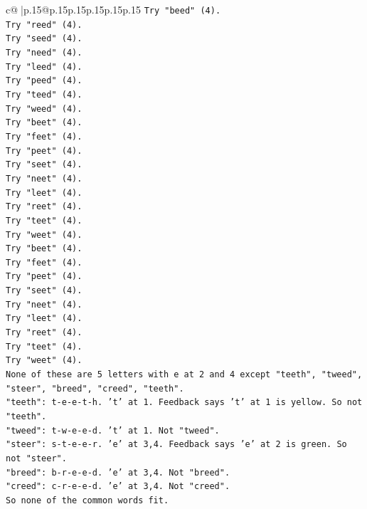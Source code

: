 \documentclass{article}
\begin{document}
{\begin{supertabular}{c@{$\;$}|p{.15\linewidth}@{}p{.15\linewidth}p{.15\linewidth}p{.15\linewidth}p{.15\linewidth}p{.15\linewidth}}
{{{\texttt{Try "beed" (4).} \\
\texttt{Try "reed" (4).} \\
\texttt{Try "seed" (4).} \\
\texttt{Try "need" (4).} \\
\texttt{Try "leed" (4).} \\
\texttt{Try "peed" (4).} \\
\texttt{Try "teed" (4).} \\
\texttt{Try "weed" (4).} \\
\texttt{Try "beet" (4).} \\
\texttt{Try "feet" (4).} \\
\texttt{Try "peet" (4).} \\
\texttt{Try "seet" (4).} \\
\texttt{Try "neet" (4).} \\
\texttt{Try "leet" (4).} \\
\texttt{Try "reet" (4).} \\
\texttt{Try "teet" (4).} \\
\texttt{Try "weet" (4).} \\
\texttt{Try "beet" (4).} \\
\texttt{Try "feet" (4).} \\
\texttt{Try "peet" (4).} \\
\texttt{Try "seet" (4).} \\
\texttt{Try "neet" (4).} \\
\texttt{Try "leet" (4).} \\
\texttt{Try "reet" (4).} \\
\texttt{Try "teet" (4).} \\
\texttt{Try "weet" (4).} \\
\texttt{None of these are 5 letters with e at 2 and 4 except "teeth", "tweed", "steer", "breed", "creed", "teeth".} \\
\texttt{"teeth": t{-}e{-}e{-}t{-}h. 't' at 1. Feedback says 't' at 1 is yellow. So not "teeth".} \\
\texttt{"tweed": t{-}w{-}e{-}e{-}d. 't' at 1. Not "tweed".} \\
\texttt{"steer": s{-}t{-}e{-}e{-}r. 'e' at 3,4. Feedback says 'e' at 2 is green. So not "steer".} \\
\texttt{"breed": b{-}r{-}e{-}e{-}d. 'e' at 3,4. Not "breed".} \\
\texttt{"creed": c{-}r{-}e{-}e{-}d. 'e' at 3,4. Not "creed".} \\
\texttt{So none of the common words fit.} \\
}}}
\end{supertabular}}
\end{document}
